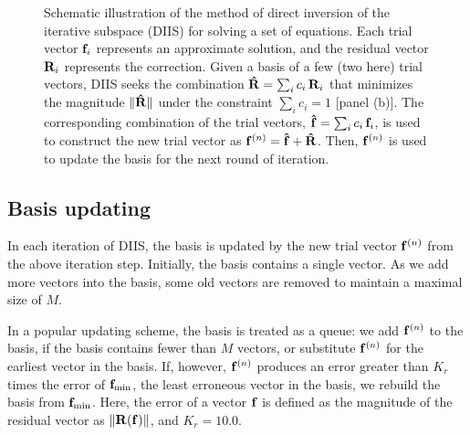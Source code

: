 \documentclass[reprint,superscriptaddress]{revtex4-1}
\begin{document}
\begin{figure}
  \caption{\label{fig:scheme}
    Schematic illustration of the method of
    direct inversion of the iterative subspace (DIIS)
    for solving a set of equations.
    Each trial vector $\mathbf{f}_i$
    represents an approximate solution,
    and the residual vector $\mathbf{R}_i$
    represents the correction.
    Given a basis of a few (two here) trial vectors,
    DIIS seeks the combination
    $\mathbf{\hat R} = \sum_i c_i \, \mathbf{R}_i$
    that minimizes the magnitude
    $\| \mathbf{\hat R} \|$
    under the constraint
    $\sum_i c_i = 1$ [panel (b)].
    The corresponding combination
    of the trial vectors,
    $\mathbf{\hat f} = \sum_i c_i \, \mathbf{f}_i$,
    is used to construct
    the new trial vector as
    $\mathbf{f}^{(n)} = \mathbf{\hat f} + \mathbf{\hat R}$.
    Then, $\mathbf{f}^{(n)}$ is used to
    update the basis
    for the next round of iteration.
  }
\end{figure}




\subsection{Basis updating}



In each iteration of DIIS,
the basis is updated
by the new trial vector $\mathbf{f}^{(n)}$
from the above iteration step.
%
Initially,
the basis contains a single vector.
%
As we add more vectors into the basis,
some old vectors are removed
to maintain a maximal size of $M$.



In a popular updating scheme\cite{kovalenko1999},
the basis is treated as a queue:
%
we add $\mathbf{f}^{(n)}$ to the basis,
if the basis contains fewer than $M$ vectors,
%
or substitute $\mathbf{f}^{(n)}$ for the earliest vector in the basis.
%
If, however, $\mathbf{f}^{(n)}$
produces an error greater than
$K_r$ times the error of
$\mathbf{f}_\mathrm{min}$,
the least erroneous vector in the basis,
%
we rebuild the basis
from $\mathbf{f}_\mathrm{min}$.
%
Here, the error of a vector $\mathbf{f}$ is defined as
the magnitude of the residual vector as
$\| \mathbf{R}(\mathbf{f}) \|$,
and
$K_r = 10.0$\cite{
kovalenko1999}.
\end{document}
